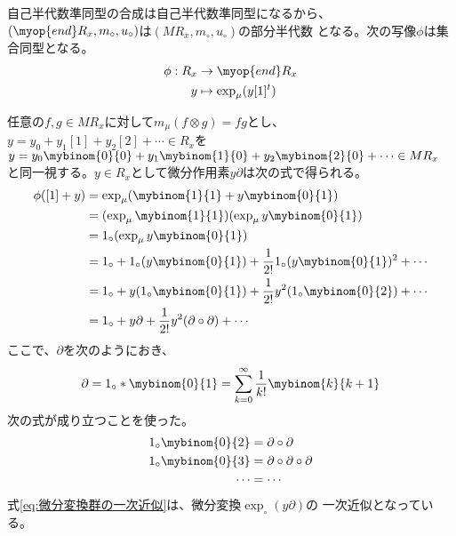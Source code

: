 \begin{todo}[until]\label{todo:until} %
	自己半代数準同型の合成は自己半代数準同型になるから、
	$(\myop{end}R_x,m_\circ,u_\circ)$は$(MR_x,m_\circ,u_\circ)$の部分半代数
	となる。次の写像$\phi$は集合同型となる。
	\begin{equation}\begin{split} %
		\phi: R_x &\to \myop{end}R_x \\ 
			y &\mapsto \exp_\mu(y[1]^t) \\
	\end{split}\end{equation} %

	任意の$f,g\in MR_x$に対して$m_\mu(f\otimes g)=fg$とし、
	$y=y_0+y_1[1]+y_2[2]+\cdots\in R_x$を
	$y=y_0\mybinom{0}{0}+y_1\mybinom{1}{0}+y_2\mybinom{2}{0}+\cdots\in MR_x$
	と同一視する。$y\in R_x$として微分作用素$y\partial$は次の式で得られる。
	\begin{equation}\label{eq:微分変換群の一次近似}\begin{split} %
		\phi([1]+y) &= \exp_\mu(\mybinom{1}{1}+y\mybinom{0}{1}) \\
			&= (\exp_\mu\mybinom{1}{1})(\exp_\mu y\mybinom{0}{1}) \\
			&= 1_\circ(\exp_\mu y\mybinom{0}{1}) \\
			&= 1_\circ + 1_\circ(y\mybinom{0}{1}) + \frac{1}{2!}1_\circ(y\mybinom{0}{1})^2 + \cdots \\
			&= 1_\circ + y(1_\circ\mybinom{0}{1}) + \frac{1}{2!}y^2(1_\circ\mybinom{0}{2}) + \cdots \\
			&= 1_\circ + y\partial + \frac{1}{2!}y^2(\partial\circ\partial) + \cdots \\
	\end{split}\end{equation} %
	ここで、$\partial$を次のようにおき、
	\begin{equation}\begin{split} %
		\partial = 1_\circ*\mybinom{0}{1} = \sum_{k=0}^\infty \frac{1}{k!}\mybinom{k}{k+1} \\
	\end{split}\end{equation} %
	次の式が成り立つことを使った。
	\begin{equation}\begin{split} %
		1_\circ\mybinom{0}{2} &= \partial\circ\partial \\
		1_\circ\mybinom{0}{3} &= \partial\circ\partial\circ\partial \\
		\cdots &= \cdots \\
	\end{split}\end{equation} %
	式\eqref{eq:微分変換群の一次近似}は、微分変換$\exp_\circ(y\partial)$の
	一次近似となっている。
\end{todo} %

